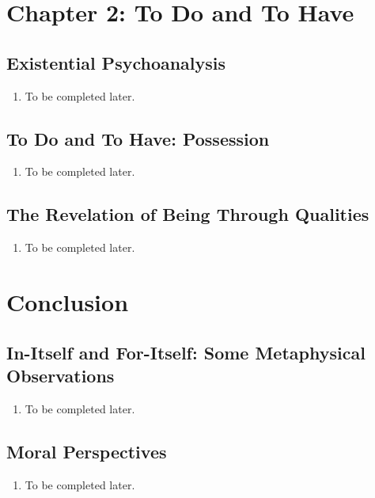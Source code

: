 \section{Chapter 2: To Do and To Have}

\subsection{Existential Psychoanalysis}

\begin{enumerate}
  \item To be completed later.
\end{enumerate}

\subsection{To Do and To Have: Possession}

\begin{enumerate}
  \item To be completed later.
\end{enumerate}

\subsection{The Revelation of Being Through Qualities}

\begin{enumerate}
  \item To be completed later.
\end{enumerate}

\section{Conclusion}

\subsection{In-Itself and For-Itself: Some Metaphysical Observations}

\begin{enumerate}
  \item To be completed later.
\end{enumerate}

\subsection{Moral Perspectives}

\begin{enumerate}
  \item To be completed later.
\end{enumerate}

